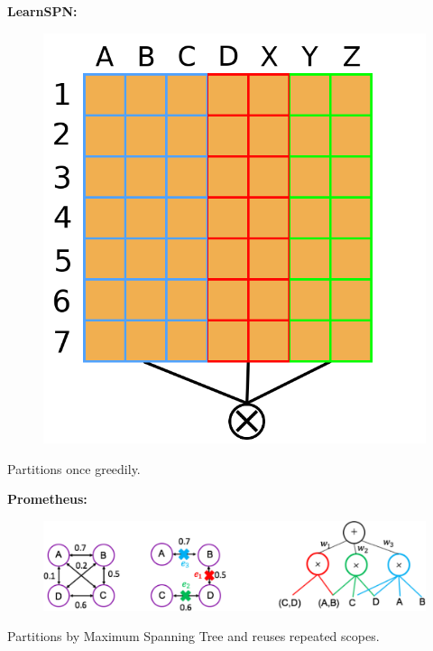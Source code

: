 \documentclass[usenames,dvipsnames]{beamer}
\begin{document}
\begin{frame}
  \textbf{LearnSPN:}

  \begin{figure}
    \centering\includegraphics[height=0.25\textheight]{imgs/split-v.png}
  \end{figure}
  \begin{center}
    Partitions once greedily.
  \end{center}

  \textbf{Prometheus:}

  \begin{figure}
    \centering\includegraphics[height=0.25\textheight]{imgs/mst_decomp.png}
  \end{figure}
  \begin{center}
    Partitions by Maximum Spanning Tree and reuses repeated scopes.
  \end{center}
\end{frame}
\end{document}
